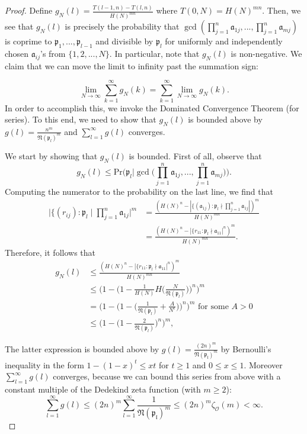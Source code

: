 \documentclass[10pt,a4paper]{article}
\theoremstyle{definition}
\theoremstyle{remark}
\newcommand{\f}[1]{\mathfrak{#1}}
\begin{document}
\begin{proof}
Define $g_N(l) = \frac{T(l-1, n) - T(l, n)}{H(N)^{mn}}$ where $T(0, N) = H(N)^{mn}$. Then, we see that $g_N(l)$ is precisely the probability that $\gcd(\prod_{j=1}^n \mathfrak{a}_{1j}, ... , \prod_{j=1}^n \mathfrak{a}_{mj})$ is coprime to $\mathfrak{p}_1, ..., \mathfrak{p}_{l-1}$ and divisible by $\mathfrak{p}_l$ for uniformly and independently chosen $\mathfrak{a}_{ij}$'s from $\{1, 2, ..., N\}$. In particular, note that $g_N(l)$ is non-negative. We claim that we can move the limit to infinity past the summation sign:

$$\lim_{N \to \infty} \sum_{k=1}^{\infty} g_N(k) = \sum_{k=1}^{\infty} \lim_{N \to \infty} g_N(k).$$
In order to accomplish this, we invoke the Dominated Convergence Theorem (for series). To this end, we need to show that $g_N(l)$ is bounded above by $g(l) = \frac{n^m}{\mathfrak{N}(\mathfrak{p}_l)^m}$ and $\sum_{l=1}^{\infty} g(l)$ converges.

We start by showing that $g_N(l)$ is bounded. First of all, observe that
$$g_N(l) \leq \text{Pr}\Big(\mathfrak{p}_l \Big| \gcd\Big(\prod_{j=1}^n \mathfrak{a}_{1j}, ... , \prod_{j=1}^n \mathfrak{a}_{mj}\Big)\Big).$$
Computing the numerator to the probability on the last line, we find that
\begin{align*} 
\Big|\{(r_{ij}) : \mathfrak{p}_l \mid \prod_{j=1}^n \mathfrak{a}_{1j}\Big|^m &= \frac{(H(N)^n - |\{(\mathfrak{a}_{1j}) : \mathfrak{p}_l \nmid \prod_{j=1}^n \mathfrak{a}_{1j}|)^m}{H(N)^{mn}}\\ &= \frac{(H(N)^n - |\{r_{11} : \mathfrak{p}_l \nmid \mathfrak{a}_{11}|^n)^m}{H(N)^{mn}}. \end{align*}
Therefore, it follows that
\begin{align*} 
g_N(l) &\leq \frac{(H(N)^n - |\{r_{11} : \mathfrak{p}_l \nmid \mathfrak{a}_{11}|^n)^m}{H(N)^{mn}}\\ &\leq \Big(1 - \Big(1 - \frac{1}{H(N)} H\Big(\frac{N}{\f{N}(\f{p}_l)}\Big)\Big)^n\Big)^m\\
&= \Big(1- \Big(1 - \Big(\frac{1}{\mathfrak{N}(\mathfrak{p}_l)} + \frac{A}{N^{\epsilon}}\Big)\Big)^n \Big)^m \text{ for some } A > 0\\ &\leq \Big(1- \Big(1 - \frac{2}{\mathfrak{N}(\mathfrak{p}_l)}\Big)^n \Big)^m, \end{align*}

The latter expression is bounded above by $g(l) = \frac{(2n)^m}{\f{N(\f{p}_l)}^m}$ by Bernoulli's inequality in the form $1-(1-x)^t\leq xt$ for $t\geq 1$ and $0\leq x \leq 1$. Moreover $\sum_{l=1}^{\infty} g(l)$ converges, because we can bound this series from above with a constant multiple of the Dedekind zeta function (with $m \geq 2$):
$$\sum_{l=1}^{\infty}g(l)\leq (2n)^m\sum_{l=1}^{\infty}\frac{1}{\f{N(\f{p}_l)}^m}\leq (2n)^m \zeta_{\mathcal{O}}(m) < \infty.$$


\end{proof}
\end{document}
